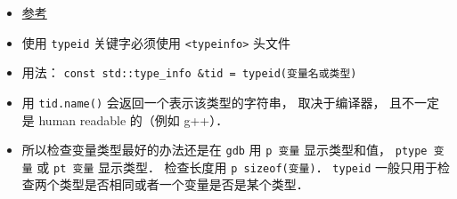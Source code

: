 
\begin{issues}
\issueDraft
\end{issues}

\begin{itemize}
\item \href{https://en.cppreference.com/w/cpp/language/typeid}{参考}
\item 使用 \verb|typeid| 关键字必须使用 \verb|<typeinfo>| 头文件
\item 用法： \verb|const std::type_info &tid = typeid(变量名或类型)|
\item 用 \verb|tid.name()| 会返回一个表示该类型的字符串， 取决于编译器， 且不一定是 human readable 的（例如 g++）．
\item 所以检查变量类型最好的办法还是在 \verb|gdb| 用 \verb|p 变量| 显示类型和值， \verb|ptype 变量| 或 \verb|pt 变量| 显示类型． 检查长度用 \verb|p sizeof(变量)|． \verb|typeid| 一般只用于检查两个类型是否相同或者一个变量是否是某个类型．
\end{itemize}
